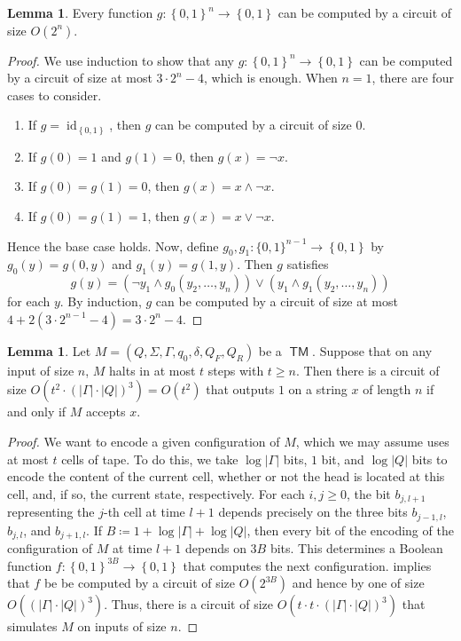 \documentclass[10pt,letterpaper,cm]{nupset}
\theoremstyle{definition}
\theoremstyle{theorem}
\newtheorem{lemma}[definition]{Lemma}
\theoremstyle{remark}
\newcommand{\1}{\mathbf{1}}
\newcommand{\0}{\vec 0}
\DeclareMathOperator{\id}{id}
\DeclareMathOperator{\TM}{\mathsf{TM}}
\begin{document}
\begin{lemma}\label{pl1}
Every function $g: \left\{0,1\right\}^n \to \left\{0,1\right\}$ can be computed by a circuit of size $O(2^n)$. 
\end{lemma}
\begin{proof}
We use induction to show that any $g:\left\{0,1\right\}^n \to \left\{0,1\right\}$ can be computed by a circuit of size at most $3 \cdot 2^n -4$, which is enough. When $n=1$, there are four cases to consider.
\begin{enumerate}[label=(\alph*)]
\item If $g= \id_{\left\{0,1\right\}}$, then $g$ can be computed by a circuit of size $0$.
\item If $g(0) =1$ and $g(1) =0$, then $g(x) = \neg x$.
\item If $g(0) = g(1) = 0$, then $g(x) = x \land \neg x$.
\item If $g(0) = g(1) = 1$, then $g(x) = x \vee \neg x$.
\end{enumerate}
Hence the base case holds. Now, define $g_0, g_1 : \{0,1 \}^{n-1} \to \left\{0,1\right\}$ by $g_0(y) = g(0, y)$ and $g_1(y) = g(1,y)$. Then $g$ satisfies $$g(y) = (\neg y_1 \land g_0(y_2, \ldots, y_n)) \vee (y_1 \land g_1(y_2, \ldots, y_n))$$ for each $y$. By induction, $g$ can be computed by a circuit of size at most $4 + 2(3 \cdot 2^{n-1} -4) = 3 \cdot 2^n -4$. 
\end{proof}

\begin{lemma}\label{pl2}
Let $M= (Q, \Sigma, \Gamma, q_0, \delta, Q_F, Q_R)$ be a $\TM$. Suppose that on any input of size $n$, $M$ halts in at most $t$ steps with $t\geq n$. Then there is a circuit of size $O(t^2 \cdot (|\Gamma|\cdot |Q|)^3) = O(t^2)$ that  outputs $1$ on a  string $x$ of length $n$ if and only if $M$ accepts $x$.
\end{lemma}
\begin{proof}
We want to encode a given configuration of $M$, which we may assume uses at most $t$ cells of tape. To do this, we take $\log{|\Gamma|}$ bits, $1$ bit, and $\log{|Q|}$ bits to encode the content of the current cell, whether or not the head is located at this cell, and, if so, the current state, respectively.  For each $i,j\geq0$, the bit $b_{j, l+1}$ representing the $j$-th cell at time $l+1$ depends precisely on the three bits $b_{j-1, l}$, $b_{j, l}$, and $b_{j+1, l}$. If $B\coloneqq 1+ \log{|\Gamma|} +\log{|Q|}$, then every bit of the encoding of the configuration of $M$ at time $l+1$ depends on $3B$ bits. This determines a Boolean function $f: \left\{0,1\right\}^{3B}\to \left\{0,1\right\}$ that computes the next configuration.  implies that $f$ be be computed by a circuit of size $O(2^{3B})$ and hence by one of size $O((|\Gamma|\cdot |Q|)^3)$. Thus, there is a circuit of size $O(t\cdot t\cdot  (|\Gamma| \cdot |Q|)^3 )$ that simulates $M$ on inputs of size $n$.
\end{proof}
\end{document}
